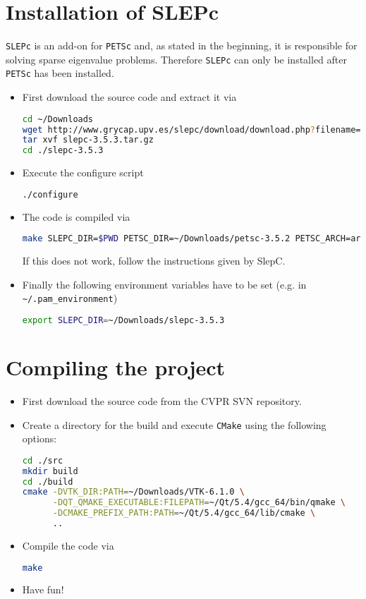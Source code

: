 \section{Installation of SLEPc}
\texttt{SLEPc} is an add-on for \texttt{PETSc} and, as stated in the beginning, it is responsible for solving sparse eigenvalue problems. Therefore \texttt{SLEPc} can only be installed after \texttt{PETSc} has been installed.
\begin{itemize}
\item First download the source code and extract it via
\begin{lstlisting}[language=bash, numbers=none]
cd ~/Downloads
wget http://www.grycap.upv.es/slepc/download/download.php?filename=slepc-3.5.3.tar.gz -O slepc-3.5.3.tar.gz
tar xvf slepc-3.5.3.tar.gz
cd ./slepc-3.5.3
\end{lstlisting}
\item Execute the configure script
\begin{lstlisting}[language=bash, numbers=none]
./configure
\end{lstlisting}

\item The code is compiled via
\begin{lstlisting}[language=bash, numbers=none]
make SLEPC_DIR=$PWD PETSC_DIR=~/Downloads/petsc-3.5.2 PETSC_ARCH=arch-linux2-c-debug
\end{lstlisting}
If this does not work, follow the instructions given by SlepC.

\item Finally the following environment variables have to be set (e.g. in \verb|~/.pam_environment|)
\begin{lstlisting}[language=bash, numbers=none]
export SLEPC_DIR=~/Downloads/slepc-3.5.3
\end{lstlisting}
\end{itemize}



\section{Compiling the project}
\begin{itemize}
\item First download the source code from the CVPR SVN repository.
\item Create a directory for the build and execute \texttt{CMake} using the following options:
\begin{lstlisting}[language=bash, numbers=none]
cd ./src
mkdir build
cd ./build
cmake -DVTK_DIR:PATH=~/Downloads/VTK-6.1.0 \
      -DQT_QMAKE_EXECUTABLE:FILEPATH=~/Qt/5.4/gcc_64/bin/qmake \
      -DCMAKE_PREFIX_PATH:PATH=~/Qt/5.4/gcc_64/lib/cmake \
      ..
\end{lstlisting}
\item Compile the code via
\begin{lstlisting}[language=bash, numbers=none]
make
\end{lstlisting}
\item Have fun!
\end{itemize}

